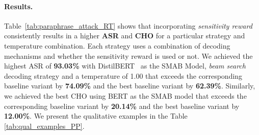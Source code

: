 \paragraph{Results.} Table~\ref{tab:paraphrase_attack_RT} shows that incorporating \textit{sensitivity reward} consistently results in a higher \textbf{ASR} and \textbf{CHO} for a particular strategy and temperature combination. Each strategy uses a combination of decoding mechanisms and whether the sensitivity reward is used or not. We achieved the highest ASR of \textbf{93.03\%} with DistilBERT~\cite{sanh2019distilbert} as the SMAB Model, \textit{beam search} decoding strategy and a temperature of 1.00 that exceeds the corresponding baseline variant by \textbf{74.09\%} and the best baseline variant by \textbf{62.39\%}. Similarly, we achieved the best CHO using BERT as the SMAB model that exceeds the corresponding baseline variant by \textbf{20.14\%} and the best baseline variant by \textbf{12.00\%}. We present the qualitative examples in the Table \ref{tab:qual_examples_PP}.

